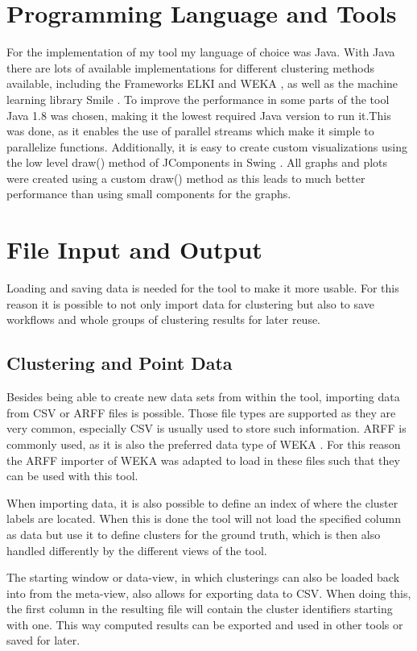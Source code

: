 \documentclass[
	a4paper,
	english,
	twoside,
	openright,               
	11pt                            
	]{report}
\begin{document}
\section{Programming Language and Tools}
For the implementation of my tool my language of choice was Java. With Java there are lots of available implementations for different clustering methods available, including the Frameworks ELKI \cite{10.1007/978-3-540-69497-7_41} and WEKA \cite{10.1145/1656274.1656278}, as well as the machine learning library Smile \cite{javasmile}. To improve the performance in some parts of the tool Java 1.8 was chosen, making it the lowest required Java version to run it.This was done, as it enables the use of parallel streams which make it simple to parallelize functions. Additionally, it is easy to create custom visualizations using the low level draw() method of JComponents in Swing \cite{javaswing}. All graphs and plots were created using a custom draw() method as this leads to much better performance than using small components for the graphs.

\section{File Input and Output}
Loading and saving data is needed for the tool to make it more usable. For this reason it is possible to not only import data for clustering but also to save workflows and whole groups of clustering results for later reuse.
\subsection{Clustering and Point Data}
Besides being able to create new data sets from within the tool, importing data from CSV or ARFF files is possible. Those file types are supported as they are very common, especially CSV is usually used to store such information. ARFF is commonly used, as it is also the preferred data type of WEKA \cite{10.1145/1656274.1656278}. For this reason the ARFF importer of WEKA was adapted to load in these files such that they can be used with this tool. 

When importing data, it is also possible to define an index of where the cluster labels are located. When this is done the tool will not load the specified column as data but use it to define clusters for the ground truth, which is then also handled differently by the different views of the tool.

The starting window or data-view, in which clusterings can also be loaded back into from the meta-view, also allows for exporting data to CSV. When doing this, the first column in the resulting file will contain the cluster identifiers starting with one. This way computed results can be exported and used in other tools or saved for later.
\end{document}
